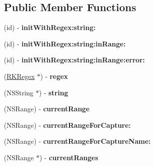 \subsection*{Public Member Functions}
\begin{DoxyCompactItemize}
\item 
\hypertarget{interface_r_k_enumerator_ab45fb744d0bc3a2aee41f469f4b0a986}{(id) -\/ {\bfseries init\-With\-Regex\-:string\-:}}\label{interface_r_k_enumerator_ab45fb744d0bc3a2aee41f469f4b0a986}

\item 
\hypertarget{interface_r_k_enumerator_ad1bad36f2d3bd3eba6de33fcafaf8e7b}{(id) -\/ {\bfseries init\-With\-Regex\-:string\-:in\-Range\-:}}\label{interface_r_k_enumerator_ad1bad36f2d3bd3eba6de33fcafaf8e7b}

\item 
\hypertarget{interface_r_k_enumerator_a4f1db961c794b75d4317c4a8e8208051}{(id) -\/ {\bfseries init\-With\-Regex\-:string\-:in\-Range\-:error\-:}}\label{interface_r_k_enumerator_a4f1db961c794b75d4317c4a8e8208051}

\item 
\hypertarget{interface_r_k_enumerator_ac308ce07de2295cc25e79ba95e8d1dee}{(\hyperlink{interface_r_k_regex}{R\-K\-Regex} $\ast$) -\/ {\bfseries regex}}\label{interface_r_k_enumerator_ac308ce07de2295cc25e79ba95e8d1dee}

\item 
\hypertarget{interface_r_k_enumerator_a65957082b543324f052a437183733b03}{(N\-S\-String $\ast$) -\/ {\bfseries string}}\label{interface_r_k_enumerator_a65957082b543324f052a437183733b03}

\item 
\hypertarget{interface_r_k_enumerator_ae5528582796723abbb37baca026f43e8}{(N\-S\-Range) -\/ {\bfseries current\-Range}}\label{interface_r_k_enumerator_ae5528582796723abbb37baca026f43e8}

\item 
\hypertarget{interface_r_k_enumerator_afcf75c6d91df537643c95fa25a66de92}{(N\-S\-Range) -\/ {\bfseries current\-Range\-For\-Capture\-:}}\label{interface_r_k_enumerator_afcf75c6d91df537643c95fa25a66de92}

\item 
\hypertarget{interface_r_k_enumerator_a0495dff66d2fb56a77565dfc394d3ec0}{(N\-S\-Range) -\/ {\bfseries current\-Range\-For\-Capture\-Name\-:}}\label{interface_r_k_enumerator_a0495dff66d2fb56a77565dfc394d3ec0}

\item 
\hypertarget{interface_r_k_enumerator_a7dbff5d0073d593ce26461924da6d781}{(N\-S\-Range $\ast$) -\/ {\bfseries current\-Ranges}}\label{interface_r_k_enumerator_a7dbff5d0073d593ce26461924da6d781}


\end{DoxyCompactItemize}

